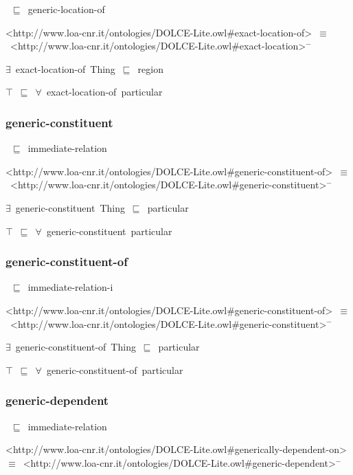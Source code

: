 \documentclass{article}
\begin{document}
~\ensuremath{\sqsubseteq}~generic-location-of

<http://www.loa-cnr.it/ontologies/DOLCE-Lite.owl#exact-location-of>~\ensuremath{\equiv}~<http://www.loa-cnr.it/ontologies/DOLCE-Lite.owl#exact-location>\ensuremath{^-}

\ensuremath{\exists}~exact-location-of~Thing~\ensuremath{\sqsubseteq}~region

\ensuremath{\top}~\ensuremath{\sqsubseteq}~\ensuremath{\forall}~exact-location-of~particular

\subsubsection*{generic-constituent}

~\ensuremath{\sqsubseteq}~immediate-relation

<http://www.loa-cnr.it/ontologies/DOLCE-Lite.owl#generic-constituent-of>~\ensuremath{\equiv}~<http://www.loa-cnr.it/ontologies/DOLCE-Lite.owl#generic-constituent>\ensuremath{^-}

\ensuremath{\exists}~generic-constituent~Thing~\ensuremath{\sqsubseteq}~particular

\ensuremath{\top}~\ensuremath{\sqsubseteq}~\ensuremath{\forall}~generic-constituent~particular

\subsubsection*{generic-constituent-of}

~\ensuremath{\sqsubseteq}~immediate-relation-i

<http://www.loa-cnr.it/ontologies/DOLCE-Lite.owl#generic-constituent-of>~\ensuremath{\equiv}~<http://www.loa-cnr.it/ontologies/DOLCE-Lite.owl#generic-constituent>\ensuremath{^-}

\ensuremath{\exists}~generic-constituent-of~Thing~\ensuremath{\sqsubseteq}~particular

\ensuremath{\top}~\ensuremath{\sqsubseteq}~\ensuremath{\forall}~generic-constituent-of~particular

\subsubsection*{generic-dependent}

~\ensuremath{\sqsubseteq}~immediate-relation

<http://www.loa-cnr.it/ontologies/DOLCE-Lite.owl#generically-dependent-on>~\ensuremath{\equiv}~<http://www.loa-cnr.it/ontologies/DOLCE-Lite.owl#generic-dependent>\ensuremath{^-}
\end{document}
